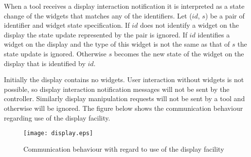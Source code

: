 \documentclass{article}
\begin{document}

   \noindent When a tool receives a display interaction notification it is
   interpreted as a state change of the widgets that matches any of the
   identifiers. Let ($id$, $s$) be a pair of identifier and widget state
   specification. If $id$ does not identify a widget on the display the state
   update represented by the pair is ignored.  If $id$ identifies a widget on
   the display and the type of this widget is not the same as that of $s$ the
   state update is ignored. Otherwise $s$ becomes the new state of the widget
   on the display that is identified by $id$.


   Initially the display contains no widgets. User interaction without widgets
   is not possible, so display interaction notification messages will not be
   sent by the controller. Similarly display manipulation requests will not be
   sent by a tool and otherwise will be ignored. The figure below shows the
   communication behaviour regarding use of the display facility.

   \begin{figure}[H]
    \begin{center}
     \texttt{[image: display.eps]}
    \end{center}
    \caption{Communication behaviour with regard to use of the display facility}
    \label{figure:display_manipulation}
    \vspace{-0.0cm}
   \end{figure}
\end{document}
